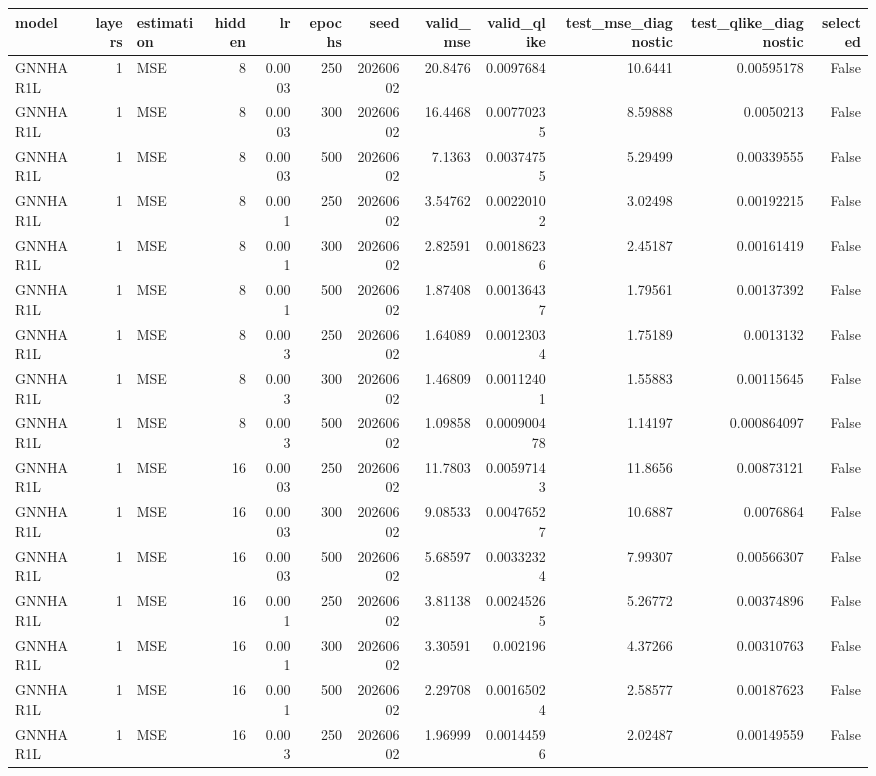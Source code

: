 \begin{tabular}{lrlrrrrrrrrr}
\toprule
model & layers & estimation & hidden & lr & epochs & seed & valid_mse & valid_qlike & test_mse_diagnostic & test_qlike_diagnostic & selected \\
\midrule
GNNHAR1L & 1 & MSE & 8 & 0.0003 & 250 & 20260602 & 20.8476 & 0.0097684 & 10.6441 & 0.00595178 & False \\
GNNHAR1L & 1 & MSE & 8 & 0.0003 & 300 & 20260602 & 16.4468 & 0.00770235 & 8.59888 & 0.0050213 & False \\
GNNHAR1L & 1 & MSE & 8 & 0.0003 & 500 & 20260602 & 7.1363 & 0.00374755 & 5.29499 & 0.00339555 & False \\
GNNHAR1L & 1 & MSE & 8 & 0.001 & 250 & 20260602 & 3.54762 & 0.00220102 & 3.02498 & 0.00192215 & False \\
GNNHAR1L & 1 & MSE & 8 & 0.001 & 300 & 20260602 & 2.82591 & 0.00186236 & 2.45187 & 0.00161419 & False \\
GNNHAR1L & 1 & MSE & 8 & 0.001 & 500 & 20260602 & 1.87408 & 0.00136437 & 1.79561 & 0.00137392 & False \\
GNNHAR1L & 1 & MSE & 8 & 0.003 & 250 & 20260602 & 1.64089 & 0.00123034 & 1.75189 & 0.0013132 & False \\
GNNHAR1L & 1 & MSE & 8 & 0.003 & 300 & 20260602 & 1.46809 & 0.00112401 & 1.55883 & 0.00115645 & False \\
GNNHAR1L & 1 & MSE & 8 & 0.003 & 500 & 20260602 & 1.09858 & 0.000900478 & 1.14197 & 0.000864097 & False \\
GNNHAR1L & 1 & MSE & 16 & 0.0003 & 250 & 20260602 & 11.7803 & 0.00597143 & 11.8656 & 0.00873121 & False \\
GNNHAR1L & 1 & MSE & 16 & 0.0003 & 300 & 20260602 & 9.08533 & 0.00476527 & 10.6887 & 0.0076864 & False \\
GNNHAR1L & 1 & MSE & 16 & 0.0003 & 500 & 20260602 & 5.68597 & 0.00332324 & 7.99307 & 0.00566307 & False \\
GNNHAR1L & 1 & MSE & 16 & 0.001 & 250 & 20260602 & 3.81138 & 0.00245265 & 5.26772 & 0.00374896 & False \\
GNNHAR1L & 1 & MSE & 16 & 0.001 & 300 & 20260602 & 3.30591 & 0.002196 & 4.37266 & 0.00310763 & False \\
GNNHAR1L & 1 & MSE & 16 & 0.001 & 500 & 20260602 & 2.29708 & 0.00165024 & 2.58577 & 0.00187623 & False \\
GNNHAR1L & 1 & MSE & 16 & 0.003 & 250 & 20260602 & 1.96999 & 0.00144596 & 2.02487 & 0.00149559 & False \\

\end{tabular}

